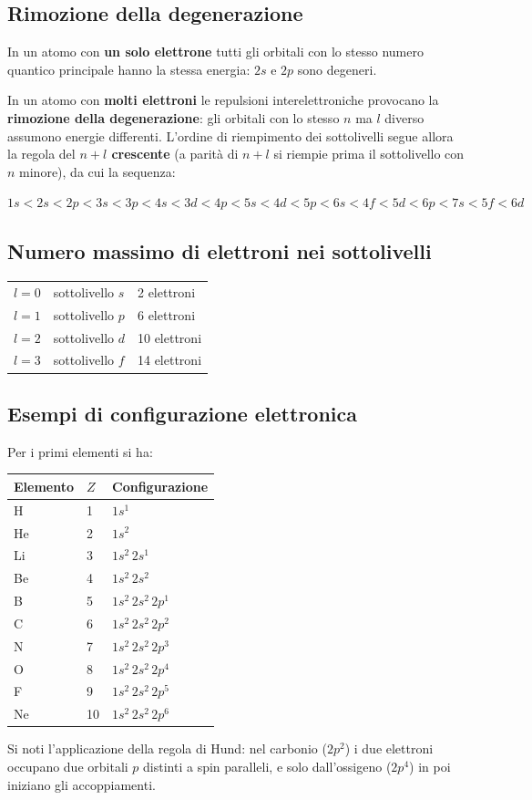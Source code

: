 \documentclass[11pt, a4paper, openright]{book}
\begin{document}
\subsection{Rimozione della degenerazione}
In un atomo con \textbf{un solo elettrone} tutti gli orbitali con lo stesso numero quantico principale hanno la stessa energia: $2s$ e $2p$ sono degeneri.

In un atomo con \textbf{molti elettroni} le repulsioni interelettroniche provocano la \textbf{rimozione della degenerazione}: gli orbitali con lo stesso $n$ ma $l$ diverso assumono energie differenti. L'ordine di riempimento dei sottolivelli segue allora la regola del \textbf{$n+l$ crescente} (a parità di $n+l$ si riempie prima il sottolivello con $n$ minore), da cui la sequenza:
\begin{center}
$1s < 2s < 2p < 3s < 3p < 4s < 3d < 4p < 5s < 4d < 5p < 6s < 4f < 5d < 6p < 7s < 5f < 6d$
\end{center}

\subsection{Numero massimo di elettroni nei sottolivelli}
\begin{center}
\begin{tabular}{lll}
\toprule
$l = 0$ & sottolivello $s$ & 2 elettroni \\
$l = 1$ & sottolivello $p$ & 6 elettroni \\
$l = 2$ & sottolivello $d$ & 10 elettroni \\
$l = 3$ & sottolivello $f$ & 14 elettroni \\
\bottomrule
\end{tabular}
\end{center}

\subsection{Esempi di configurazione elettronica}
Per i primi elementi si ha:
\begin{center}
\begin{tabular}{lll}
\toprule
\textbf{Elemento} & $Z$ & \textbf{Configurazione} \\
\midrule
H & 1 & $1s^1$ \\
He & 2 & $1s^2$ \\
Li & 3 & $1s^2\,2s^1$ \\
Be & 4 & $1s^2\,2s^2$ \\
B & 5 & $1s^2\,2s^2\,2p^1$ \\
C & 6 & $1s^2\,2s^2\,2p^2$ \\
N & 7 & $1s^2\,2s^2\,2p^3$ \\
O & 8 & $1s^2\,2s^2\,2p^4$ \\
F & 9 & $1s^2\,2s^2\,2p^5$ \\
Ne & 10 & $1s^2\,2s^2\,2p^6$ \\
\bottomrule
\end{tabular}
\end{center}
Si noti l'applicazione della regola di Hund: nel carbonio ($2p^2$) i due elettroni occupano due orbitali $p$ distinti a spin paralleli, e solo dall'ossigeno ($2p^4$) in poi iniziano gli accoppiamenti.
\end{document}
